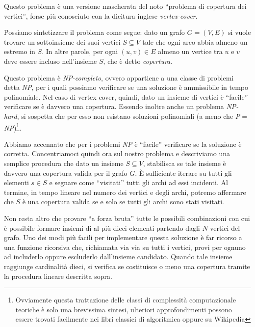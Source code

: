 \begin{solution}
    \renewcommand{\O}{\mathcal{O}}

Questo problema è una versione mascherata del noto ``problema di copertura dei vertici'', forse più conosciuto con la dicitura inglese \emph{vertex-cover}.

Possiamo sintetizzare il problema come segue: dato un grafo $G=(V,E)$ si vuole trovare un sottoinsieme dei suoi vertici $S \subseteq V$ tale che ogni arco abbia almeno un estremo in $S$. In altre parole, per ogni $(u,v) \in E$ almeno un vertice tra $u$ e $v$ deve essere incluso nell'insieme $S$, che è detto \emph{copertura}.

Questo problema è \emph{NP-completo}, ovvero appartiene a una classe di problemi detta \emph{NP}, per i quali possiamo verificare se una soluzione è ammissibile in tempo polinomiale. Nel caso di vertex cover, quindi, dato un insieme di vertici è ``facile'' verificare se è davvero una copertura. Essendo inoltre anche un problema \emph{NP-hard}, si sospetta che per esso non esistano soluzioni polinomiali (a meno che \emph{P}$=$\emph{NP})\footnote{Ovviamente questa trattazione delle classi di complessità computazionale teoriche è solo una brevissima sintesi, ulteriori approfondimenti possono essere trovati facilmente nei libri classici di algoritmica oppure su Wikipedia}.

\Esponenziale
Abbiamo accennato che per i problemi \emph{NP} è ``facile'' verificare se la soluzione è corretta. Concentriamoci quindi ora sul nostro problema e descriviamo una semplice procedura che dato un insieme $S \subseteq V$, stabilisca se tale insieme è davvero una copertura valida per il grafo $G$. È sufficiente iterare su tutti gli elementi $s \in S$ e segnare come ``visitati'' tutti gli archi ad essi incidenti. Al termine, in tempo lineare nel numero dei vertici e degli archi, potremo affermare che $S$ è una copertura valida se e solo se tutti gli archi sono stati visitati.

Non resta altro che provare ``a forza bruta'' tutte le possibili combinazioni con cui è possibile formare insiemi di al più dieci elementi partendo dagli $N$ vertici del grafo. Uno dei modi più facili per implementare questa soluzione è far ricorso a una funzione ricorsiva che, richiamata via via su tutti i vertici, provi per ognuno ad includerlo oppure escluderlo dall'insieme candidato. Quando tale insieme raggiunge cardinalità dieci, si verifica se costituisce o meno una copertura tramite la procedura lineare descritta sopra.


\end{solution}
